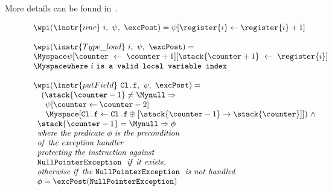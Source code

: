  More details can be found in~\cite{WPBC}.
\begin{figure}[ht]

$$
\begin{array}{l}
\wpi(\instr{iinc} \  i , \ \psi, \ \excPost) = \psi[\register{i} \leftarrow \register{i} + 1 ] \\
\\
\wpi(\instr{Type\_load} \ i, \ \psi, \ \excPost) =  \\
\Myspace \psi[\counter \ \leftarrow \ \counter+1] [\stack{\counter+1} \ \leftarrow \ \register{i}] \\
 \Myspace \texttt{where} \ i \ \texttt{is a valid local variable index}   \\
\\ 
\wpi(\instr{putField} \ \texttt{Cl.f}, \ \psi, \ \excPost) = \\
\begin{array}{l}
\begin{array}{l}
   (\stack{\counter -1} \not= \Mynull \Rightarrow  \\
   \begin{array}{l} \psi [\counter \leftarrow \counter-2 ] \\[0 mm] 
   \Myspace  [\texttt{Cl.f} \leftarrow \texttt{Cl.f}\oplus [\stack{\counter -1} \rightarrow \stack{\counter}] ] )\ \wedge 
\end{array}
\end{array}
   \\
   \stack{\counter-1} = \Mynull \Rightarrow \phi  \\
   \it{where \ the \ predicate \ \phi \  is \ the \ precondition} \\
   \it{ of \ the \ exception \ handler \ }\\ 
   \it{ protecting \ the \ instruction \  against} \\ 
   \tt{NullPointerException } \ \it{\ if \ it \  exists,}  \\
   \it{otherwise \ if \ the } \ \tt{ NullPointerException} \ \it{\ is \ not \ handled}    \\
      \phi = \excPost(\tt{NullPointerException})
    \end{array}
 \end{array} $$




\end{figure}
